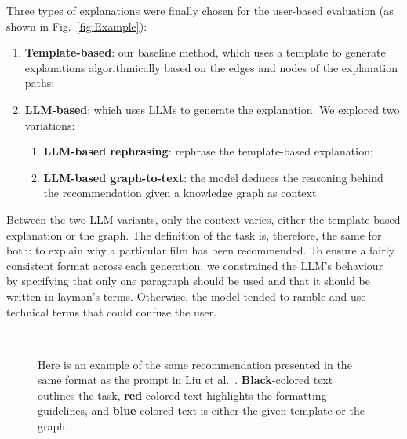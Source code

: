 Three types of explanations were finally chosen for the user-based evaluation (as shown in Fig.~\ref{fig:Example}):
\begin{enumerate}
    \item \textbf{Template-based}: our baseline method, which uses a template to generate explanations algorithmically based on the edges and nodes of the explanation paths;
    \item \textbf{LLM-based}: which uses LLMs to generate the explanation. We explored two variations:
          \begin{enumerate}
              \item \textbf{LLM-based rephrasing}: rephrase the template-based explanation;
              \item \textbf{LLM-based graph-to-text}: the model deduces the reasoning behind the recommendation given a knowledge graph as context.
          \end{enumerate}
\end{enumerate}

Between the two LLM variants, only the context varies, either the template-based explanation or the graph. The definition of the task is, therefore, the same for both: to explain why a particular film has been recommended. To ensure a fairly consistent format across each generation, we constrained the LLM's behaviour~\cite{reynolds2021prompt} by specifying that only one paragraph should be used and that it should be written in layman's terms. Otherwise, the model tended to ramble and use technical terms that could confuse the user.

\begin{figure}[!ht]
    \centering
    \\

    \caption{
        {Here is an example of the same recommendation presented in the same format as the prompt in Liu et al.~\cite{liu2023chatgpt}. \textbf{Black}-colored text outlines the task, \color{dark_red}\textbf{red}}-colored text highlights the formatting guidelines, and
            {\color{indigo}\textbf{blue}}-colored text is either the given template or the graph.
    }

\end{figure}
